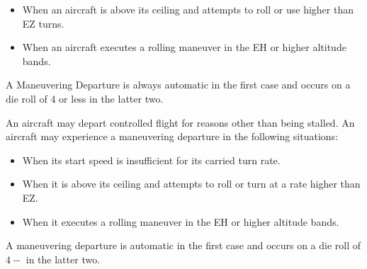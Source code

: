\begin{advancedrules}
{\begin{itemize}
    \item When an aircraft is above its ceiling and attempts to roll or use higher than EZ turns.

    \item When an aircraft executes a rolling maneuver in the EH or higher altitude bands.

\end{itemize}

A Maneuvering Departure is always automatic in the first case and occurs on a die roll of 4 or less in the latter two.  
}{
An aircraft may depart controlled flight for reasons other than being stalled. An aircraft may experience a maneuvering departure in the following situations:

\begin{itemize}
\item When its start speed is insufficient for its carried turn rate.

    \item When it is above its ceiling and attempts to roll or turn at a rate higher than EZ.

    \item When it executes a rolling maneuver in the EH or higher altitude bands.

\end{itemize}

A maneuvering departure is automatic in the first case and occurs on a die roll of $4-$ in the latter two. 
}

\end{advancedrules}

